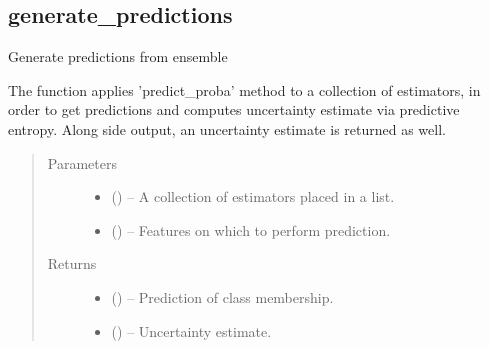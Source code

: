 \documentclass[letterpaper,10pt,english]{sphinxmanual}
\begin{document}
\subsection{generate\_predictions}
\label{\detokenize{api/ucf.generate_predictions:generate-predictions}}\label{\detokenize{api/ucf.generate_predictions::doc}}

\begin{fulllineitems}
\label{\detokenize{api/ucf.generate_predictions:ucf.generate_predictions}}
Generate predictions from ensemble

The function applies 'predict\_proba' method to a collection
of estimators, in order to get predictions and computes uncertainty
estimate via predictive entropy. Along side output, an
uncertainty estimate is returned as well.
\begin{quote}\begin{description}
\item[{Parameters}] \leavevmode\begin{itemize}
\item {} 
 () -- A collection of estimators placed in a list.

\item {} 
 () -- Features on which to perform prediction.

\end{itemize}

\item[{Returns}] \leavevmode
\begin{itemize}
\item {} 
 () -- Prediction of class membership.

\item {} 
 () -- Uncertainty estimate.

\end{itemize}


\end{description}\end{quote}

\end{fulllineitems}
\end{document}
